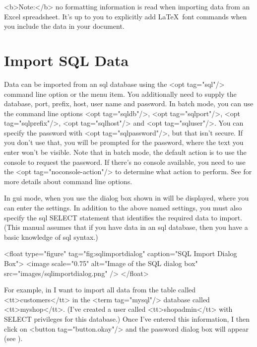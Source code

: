    <b>Note:</b> no formatting information is read when importing
   data from an Excel spreadsheet. It's up to you to explicitly
   add \LaTeX\ font commands when you include the data in your
   document.


\section{Import SQL Data}\label{sec:importsql}

   Data can be imported from an \gls{sql} database using
   the <opt tag="sql"/> command line option or the 
    menu item. You additionally need to
   supply the database, port, prefix, host, user name and password. In batch 
   mode, you can use the command line options <opt tag="sqldb"/>,
   <opt tag="sqlport"/>, <opt tag="sqlprefix"/>, <opt tag="sqlhost"/> and
   <opt tag="sqluser"/>. You can specify the password with 
   <opt tag="sqlpassword"/>, but that isn't secure. If you don't use that, 
   you will be prompted for the password, where the text you enter 
   won't be visible. Note that in batch mode, the default action
   is to use the console to request the password. If there's no console available, you need to use the <opt tag="noconsole-action"/>
   to determine what action to perform. See  for more details
   about command line options.


   In \gls{gui} mode, when you use 
   the dialog box shown in  will be displayed,
   where you can enter the settings. In addition to the above named settings,
   you must also specify the \gls{sql} SELECT statement that identifies 
   the required data to import. (This manual assumes that if you have
   data in an \gls{sql} database, then you have a basic
   knowledge of \gls{sql} syntax.)

     <float type="figure" tag="fig:sqlimportdialog" caption="SQL Import Dialog Box">
      <image scale="0.75" alt="Image of the SQL dialog box" src="images/sqlimportdialog.png" />
     </float>

   For example, in  I want to import all
   data from the table called <tt>customers</tt> in the <term tag="mysql"/>
   database called <tt>myshop</tt>. (I've created a user called
   <tt>shopadmin</tt> with SELECT privileges for this database.) Once I've 
   entered this information,
   I then click on <button tag="button.okay"/> and the password
   dialog box will appear (see ).

